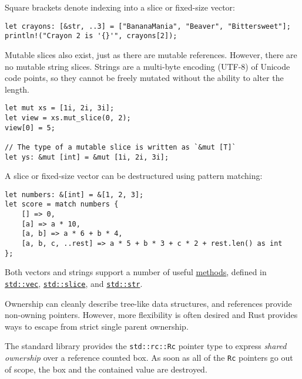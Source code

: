 \documentclass[]{article}
\begin{document}
Square brackets denote indexing into a slice or fixed-size vector:

\begin{verbatim}
let crayons: [&str, ..3] = ["BananaMania", "Beaver", "Bittersweet"];
println!("Crayon 2 is '{}'", crayons[2]);
\end{verbatim}

Mutable slices also exist, just as there are mutable references.
However, there are no mutable string slices. Strings are a multi-byte
encoding (UTF-8) of Unicode code points, so they cannot be freely
mutated without the ability to alter the length.

\begin{verbatim}
let mut xs = [1i, 2i, 3i];
let view = xs.mut_slice(0, 2);
view[0] = 5;

// The type of a mutable slice is written as `&mut [T]`
let ys: &mut [int] = &mut [1i, 2i, 3i];
\end{verbatim}

A slice or fixed-size vector can be destructured using pattern matching:

\begin{verbatim}
let numbers: &[int] = &[1, 2, 3];
let score = match numbers {
    [] => 0,
    [a] => a * 10,
    [a, b] => a * 6 + b * 4,
    [a, b, c, ..rest] => a * 5 + b * 3 + c * 2 + rest.len() as int
};
\end{verbatim}

Both vectors and strings support a number of useful
\hyperref[methods]{methods}, defined in
\href{std/vec/index.html}{\texttt{std::vec}},
\href{std/slice/index.html}{\texttt{std::slice}}, and
\href{std/str/index.html}{\texttt{std::str}}.


Ownership can cleanly describe tree-like data structures, and references
provide non-owning pointers. However, more flexibility is often desired
and Rust provides ways to escape from strict single parent ownership.

The standard library provides the \texttt{std::rc::Rc} pointer type to
express \emph{shared ownership} over a reference counted box. As soon as
all of the \texttt{Rc} pointers go out of scope, the box and the
contained value are destroyed.
\end{document}
